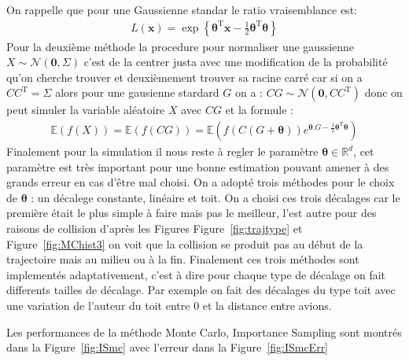 \documentclass[a4paper, 12pt,twoside]{article}
\numberwithin{equation}{subsection}
\begin{document}
	On rappelle que pour une Gaussienne standar le ratio vraisemblance est:
	\begin{align}
		L(\boldsymbol x) = \exp\left \{
		\boldsymbol\theta^\mathrm{T} {\mathbf x}
		-\frac{1}{2} \boldsymbol\theta^\mathrm{T} \boldsymbol\theta
		\right \}
	\end{align}
	Pour la deuxième méthode la procedure pour normaliser une gaussienne $X \sim \mathcal{N}(\boldsymbol 0, \Sigma)$ c'est de la centrer justa avec une modification de la probabilité qu'on cherche trouver et deuxièmement trouver sa racine carré car si on a $CC^{\mathrm{T}}=\Sigma$ alors pour une gausienne stardard $G$ on a : $CG \sim \mathcal{N} (\boldsymbol 0, C C^{\mathrm{T}})$ donc on peut simuler la variable aléatoire $X$ avec $CG$ et la formule :
	\begin{align}
		\mathbb{E}(f(X)) = \mathbb{E}(f(CG)) = 
		\mathbb{E}(
		f(C(G+{\boldsymbol \theta}))
		e^{{\boldsymbol \theta}.G
		 -\frac{1}{2} \boldsymbol\theta^\mathrm{T} \boldsymbol\theta})
	\end{align}
	Finalement pour la simulation il nous reste à regler le paramètre $\boldsymbol \theta \in \mathbb{R}^{d}$, cet paramètre est très important pour une bonne estimation pouvant amener à des grands erreur en cas d'être mal choisi. On a adopté trois méthodes pour le choix de $\boldsymbol \theta$ : un décalege constante, linéaire et toit. On a choisi ces trois décalages car le première était le plus simple à faire mais pas le meilleur, l'est autre pour des raisons de collision d'après les Figures Figure~\ref{fig:trajtype} et Figure~\ref{fig:MChist3} on voit que la collision se produit pas au début de la trajectoire mais au milieu ou à la fin. Finalement ces trois méthodes sont implementés adaptativement, c'est à dire pour chaque type de décalage on fait differents tailles de décalage. Par exemple on fait des décalages du type toit avec une variation de l'auteur du toit entre 0 et la distance entre avions.
	
	Les performances de la méthode Monte Carlo, Importance Sampling sont montrés dans la Figure~\ref{fig:ISmc} avec l'erreur dans la Figure~\ref{fig:ISmcErr}
	
\end{document}
